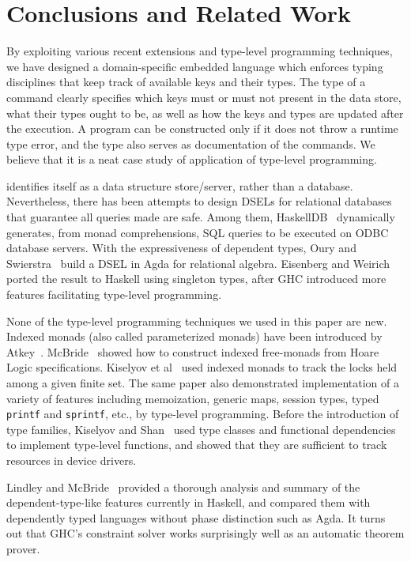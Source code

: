 
\section{Conclusions and Related Work}
\label{sec:conclusions}

By exploiting various recent extensions and type-level programming techniques,
we have designed a domain-specific embedded language \Edis{} which enforces
typing disciplines that keep track of available keys and their types. The
type of a command clearly specifies which keys must or must not present in
the data store, what their types ought to be, as well as how the keys and types are updated after the execution. A program can be constructed only if it does
not throw a runtime type error, and the type also serves as documentation of the
commands. We believe that it is a neat case study of application of type-level programming.

\Redis{} identifies itself as a data structure store/server, rather than a
database. Nevertheless, there has been attempts to design DSELs for relational
databases that guarantee all queries made are safe. Among them, {\sc HaskellDB}~\cite{haskelldb,haskelldbimproved} dynamically generates, from monad comprehensions, SQL queries to be executed on ODBC database servers.
With the expressiveness of dependent types, Oury and Swierstra~\cite{pi}
build a DSEL in Agda for relational algebra. Eisenberg and
Weirich~\cite{singletons} ported the result to Haskell using singleton types, after GHC introduced more features facilitating type-level programming.

None of the type-level programming techniques we used in this paper are new.
Indexed monads (also called parameterized monads) have been introduced by
Atkey~\cite{indexedmonad}. McBride~\cite{kleisli} showed how to construct
indexed free-monads from Hoare Logic specifications. Kiselyov et
al~\cite{typefun} used indexed monads to track the locks held among a given
finite set. The same paper also demonstrated implementation of a variety of
features including memoization, generic maps, session types, typed
\texttt{printf} and \texttt{sprintf}, etc., by type-level programming.
Before the introduction of type families, Kiselyov and
Shan~\cite{staticresources} used type classes and functional dependencies to
implement type-level functions, and showed that they are sufficient to track
resources in device drivers.

Lindley and McBride~\cite{phasedistinction} provided a thorough analysis and summary of the dependent-type-like features currently in Haskell, and
compared them with dependently typed languages without phase distinction such as Agda. It turns out that GHC's constraint solver works surprisingly well as an
automatic theorem prover.
